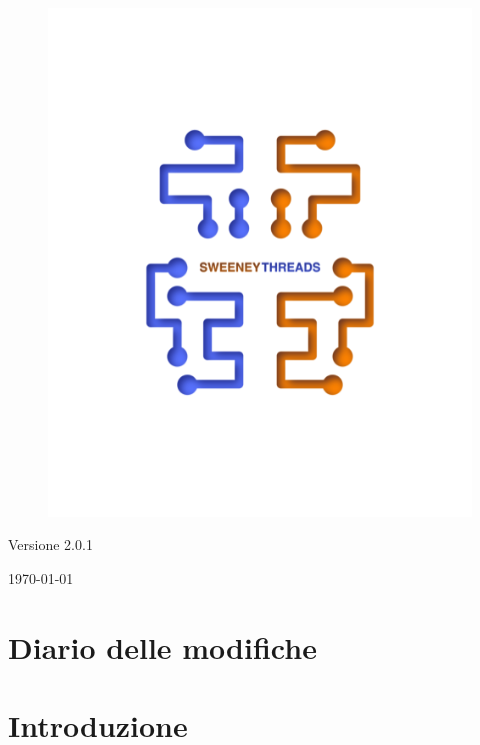 \documentclass[a4paper]{article}
\begin{document}
\begin{titlepage}
		\begin{figure}[H]
			\centering
			\includegraphics[scale=0.8]{sweeney.png}
		\end{figure}
		\begin{center}
			Versione 2.0.1
		\end{center}
		{\large \today}\\[3cm]
		\vfill
	\end{titlepage}


	\tableofcontents

	\newpage
	\section*{Diario delle modifiche}

	\newpage
	\section{Introduzione}
\end{document}
